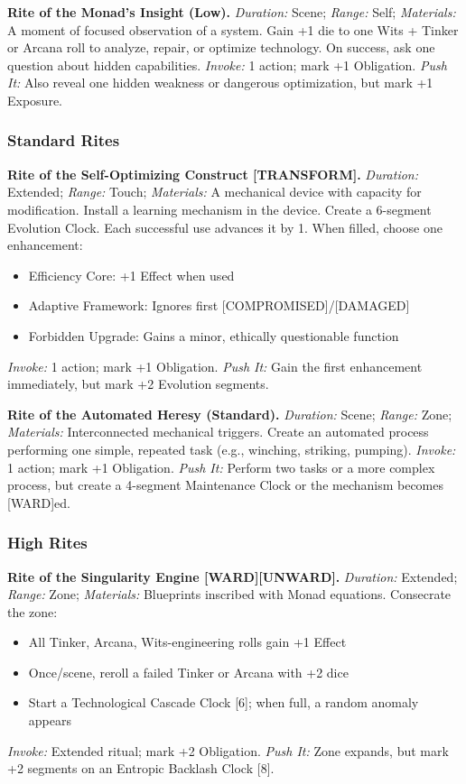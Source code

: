 \textbf{Rite of the Monad's Insight (Low).}  
\emph{Duration:} Scene; \emph{Range:} Self; \emph{Materials:} A moment of focused observation of a system.  
Gain +1 die to one Wits + Tinker or Arcana roll to analyze, repair, or optimize technology. On success, ask one question about hidden capabilities.  
\emph{Invoke:} 1 action; mark +1 Obligation.  
\emph{Push It:} Also reveal one hidden weakness or dangerous optimization, but mark +1 Exposure.

\subsubsection*{Standard Rites}

\textbf{Rite of the Self-Optimizing Construct [TRANSFORM].}  
\emph{Duration:} Extended; \emph{Range:} Touch; \emph{Materials:} A mechanical device with capacity for modification.  
Install a learning mechanism in the device. Create a 6-segment Evolution Clock. Each successful use advances it by 1. When filled, choose one enhancement:  
\begin{itemize}
  \item Efficiency Core: +1 Effect when used  
  \item Adaptive Framework: Ignores first [COMPROMISED]/[DAMAGED]  
  \item Forbidden Upgrade: Gains a minor, ethically questionable function  
\end{itemize}
\emph{Invoke:} 1 action; mark +1 Obligation.  
\emph{Push It:} Gain the first enhancement immediately, but mark +2 Evolution segments.

\textbf{Rite of the Automated Heresy (Standard).}  
\emph{Duration:} Scene; \emph{Range:} Zone; \emph{Materials:} Interconnected mechanical triggers.  
Create an automated process performing one simple, repeated task (e.g., winching, striking, pumping).  
\emph{Invoke:} 1 action; mark +1 Obligation.  
\emph{Push It:} Perform two tasks or a more complex process, but create a 4-segment Maintenance Clock or the mechanism becomes [WARD]ed.

\subsubsection*{High Rites}

\textbf{Rite of the Singularity Engine [WARD][UNWARD].}  
\emph{Duration:} Extended; \emph{Range:} Zone; \emph{Materials:} Blueprints inscribed with Monad equations.  
Consecrate the zone:  
\begin{itemize}
  \item All Tinker, Arcana, Wits-engineering rolls gain +1 Effect  
  \item Once/scene, reroll a failed Tinker or Arcana with +2 dice  
  \item Start a Technological Cascade Clock [6]; when full, a random anomaly appears  
\end{itemize}
\emph{Invoke:} Extended ritual; mark +2 Obligation.  
\emph{Push It:} Zone expands, but mark +2 segments on an Entropic Backlash Clock [8].

